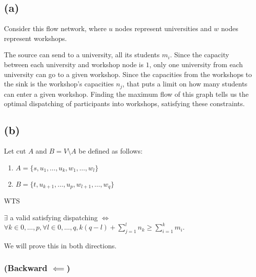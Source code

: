 \subsection*{(a)}

Consider this flow network, where $u$ nodes represent universities and $w$ nodes represent workshops.

The source can send to a university, all its students $m_i$. Since the capacity between each university and workshop node is $1$, only one university from each university can go to a given workshop. Since the capacities from the workshops to the sink is the workshop's capacities $n_j$, that puts a limit on how many students can enter a given workshop. Finding the maximum flow of this graph tells us the optimal dispatching of participants into workshops, satisfying these constraints.

\subsection*{(b)}

Let cut $A$ and $B = V \setminus A$ be defined as follows:
\begin{enumerate}
    \item $A = \{s, u_1, \dots, u_k, w_1, \dots, w_l\}$
    \item $B = \{t, u_{k+1}, \dots, u_p, w_{l+1}, \dots, w_q\}$
\end{enumerate}

WTS

$\exists$ a valid satisfying dispatching $\iff$ $\forall k \in {0, \dots, p}, \forall l \in {0, \dots, q}, k(q-l) + \sum_{j=1}^{l} n_k \geq \sum_{i=1}^{k} m_i$.

We will prove this in both directions.



\subsubsection*{(Backward $\impliedby$)}